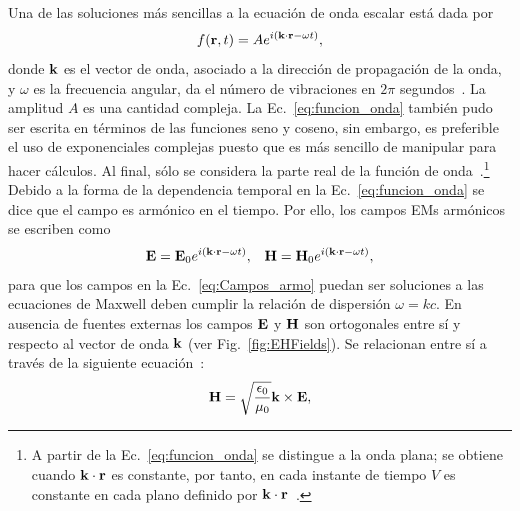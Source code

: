 Una de las soluciones más sencillas a la ecuación de onda escalar está dada por~\cite{griffiths2013electrodynamics}
\begin{equation}
f(\vb{r},t)=Ae^{i\left(\vb{k}\cdot\vb{r}-\omega t\right)},\label{eq:funcion_onda}
\end{equation}
donde $\vb{k}$ es el vector de onda, asociado a la dirección de propagación de la onda, y $\omega$ es la frecuencia angular, da el número de vibraciones en $2\pi$ segundos~\cite{born2005principles}. La amplitud $A$ es una cantidad compleja. La Ec.~\eqref{eq:funcion_onda} también pudo ser escrita en términos de las funciones seno y coseno, sin embargo, es preferible el uso de exponenciales complejas puesto que es más sencillo de manipular para hacer cálculos. Al final, sólo se considera la parte real de la función de onda~\cite{griffiths2013electrodynamics}.\footnote{A partir de la Ec.~\eqref{eq:funcion_onda} se distingue a la onda plana; se obtiene cuando $\vb{k}\cdot\vb{r}$ es constante, por tanto, en cada instante de tiempo $V$ es constante en cada plano definido por $\vb{k}\cdot\vb{r}$~\cite{griffiths2013electrodynamics}.} \\

Debido a la forma de la dependencia temporal en la Ec.~\eqref{eq:funcion_onda} se dice que el campo es armónico en el tiempo. Por ello, los campos EMs armónicos se escriben como~\cite{griffiths2013electrodynamics}
%
\begin{eqnarray}
\vb{E}=\vb{E}_{0}e^{i\left(\vb{k}\cdot\vb{r}-\omega t\right)},&&\vb{H}=\vb{H}_{0}e^{i\left(\vb{k}\cdot\vb{r}-\omega t\right)},\label{eq:Campos_armo}
\end{eqnarray}
para que los campos en la Ec.~\eqref{eq:Campos_armo} puedan ser soluciones a las ecuaciones de Maxwell deben cumplir la relación de dispersión $\omega=kc$. En ausencia de fuentes externas los campos $\vb{E}$ y $\vb{H}$ son ortogonales entre sí y respecto al vector de onda $\vb{k}$ (ver Fig.~\ref{fig:EHFields}). Se relacionan entre sí a través de la siguiente ecuación~\cite{griffiths2013electrodynamics}:
\begin{equation}
\vb{H}=\sqrt{\frac{\epsilon_{0}}{\mu_{0}}}\vb{k}\times\vb{E},
\end{equation}

